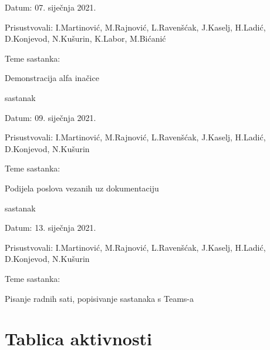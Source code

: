 \begin{packed_enum}
\begin{packed_item}
	\item Datum: 07. siječnja 2021.
	\item Prisustvovali: I.Martinović, M.Rajnović, L.Ravenšćak, J.Kaselj, H.Ladić, D.Konjevod, N.Kušurin, K.Labor, M.Bićanić
	\item Teme sastanka: 
	\begin{packed_item}
		\item   Demonstracija alfa inačice
	\end{packed_item}
\end{packed_item}
\item sastanak
\item[] \begin{packed_item}
	\item Datum: 09. siječnja 2021.
	\item Prisustvovali: I.Martinović, M.Rajnović, L.Ravenšćak, J.Kaselj, H.Ladić, D.Konjevod, N.Kušurin
	\item Teme sastanka: 
	\begin{packed_item}
		\item   Podijela poslova vezanih uz dokumentaciju
	\end{packed_item}
\end{packed_item}
\item sastanak
\item[] \begin{packed_item}
	\item Datum: 13. siječnja 2021.
	\item Prisustvovali: I.Martinović, M.Rajnović, L.Ravenšćak, J.Kaselj, H.Ladić, D.Konjevod, N.Kušurin
	\item Teme sastanka: 
	\begin{packed_item}
		\item   Pisanje radnih sati, popisivanje sastanaka s Teams-a
	\end{packed_item}
\end{packed_item}
	
	
	
		
			
		\end{packed_enum}
		
			
		\eject
		\section*{Tablica aktivnosti}
		
